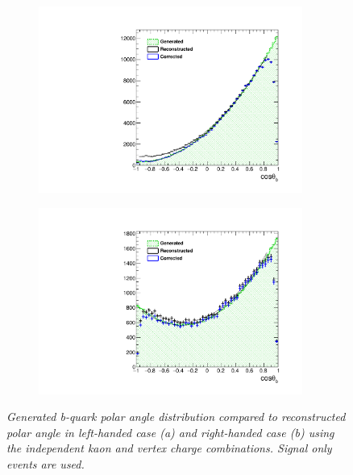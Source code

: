 \begin{figure}
	\centering
	\begin{subfigure}{0.5\textwidth}
		\includegraphics[width=0.95\textwidth]{ILD/plots/basymmetry-rec-corr-nobkg-left.pdf}
		\caption{\label{fig:BAsymmetryCorrected_a_3} }
	\end{subfigure}%
	\begin{subfigure}{0.5\textwidth}
		\centering
			\includegraphics[width=0.95\textwidth]{ILD/plots/basymmetry-rec-corr-nobkg-right.pdf}
		\caption{\label{fig:BAsymmetryCorrected_b_3} }
	\end{subfigure}
	\caption{\sl Generated b-quark polar angle distribution compared to reconstructed polar angle in left-handed case (a) and right-handed case (b) using the independent kaon and vertex charge combinations. Signal only events are used. }
	\label{fig:BAsymmetryCorrected_3}
\end{figure}



